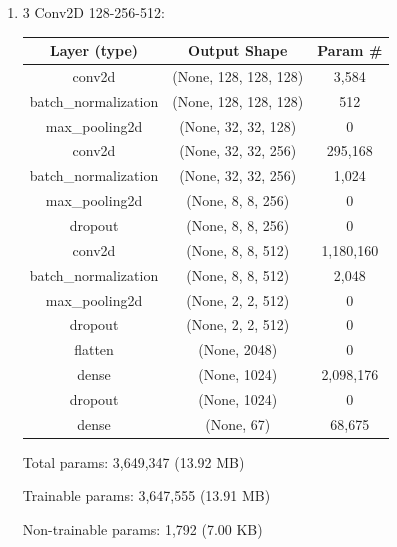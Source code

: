 \documentclass{article}
\begin{document}
\begin{enumerate}
        \item 3 Conv2D 128-256-512:
            \begin{table}[h!]
                \centering
                \begin{tabular}{|c|c|c|}
                    \hline
                    Layer (type) & Output Shape & Param \# \\
                    \hline
                    conv2d & (None, 128, 128, 128) & 3,584 \\
                    \hline
                    batch\_normalization & (None, 128, 128, 128) & 512 \\
                    \hline
                    max\_pooling2d & (None, 32, 32, 128) & 0 \\
                    \hline
                    conv2d & (None, 32, 32, 256) & 295,168 \\
                    \hline
                    batch\_normalization & (None, 32, 32, 256) & 1,024 \\
                    \hline
                    max\_pooling2d & (None, 8, 8, 256) & 0 \\
                    \hline
                    dropout & (None, 8, 8, 256) & 0 \\
                    \hline
                    conv2d & (None, 8, 8, 512) & 1,180,160 \\
                    \hline
                    batch\_normalization & (None, 8, 8, 512) & 2,048 \\
                    \hline
                    max\_pooling2d & (None, 2, 2, 512) & 0 \\
                    \hline
                    dropout & (None, 2, 2, 512) & 0 \\
                    \hline
                    flatten & (None, 2048) & 0 \\
                    \hline
                    dense & (None, 1024) & 2,098,176 \\
                    \hline
                    dropout & (None, 1024) & 0 \\
                    \hline
                    dense & (None, 67) & 68,675 \\
                    \hline
                \end{tabular}
            \end{table}
        
            Total params: 3,649,347 (13.92 MB)
        
            Trainable params: 3,647,555 (13.91 MB)
        
            Non-trainable params: 1,792 (7.00 KB)
    
\end{enumerate}
\end{document}
